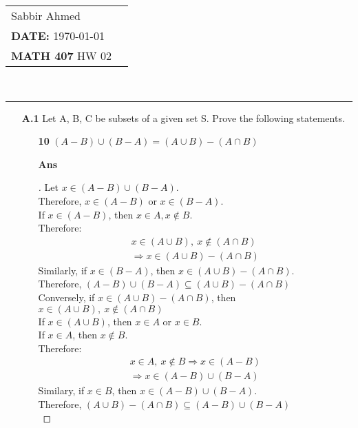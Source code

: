 \documentclass[paper=usletter, fontsize=12pt]{article}
\newcommand{\documentinfo}[5]{
    \begin{centering}
        \parbox{2in}{
        \begin{spacing}{1}
            \begin{flushleft}
                \begin{tabular}{l l}
                    #1 \\
                    #2 \\
                    #3 \\
                \end{tabular}\\
                \rule{\textwidth}{1pt}
            \end{flushleft}
        \end{spacing}
        }
    \end{centering}
}
\begin{document}
    \documentinfo{Sabbir Ahmed}{\textbf{DATE:} \today}{\textbf{MATH 407} HW 02}
    \vspace{-0.2in}

    \begin{itemize}

        \item[\textbf{A.1}] Let A, B, C be subsets of a given set S. Prove the
        following statements.

            \begin{itemize}

                \item[\textbf{10}] $(A - B) \cup (B - A) = (A \cup B) - (A \cap
                B)$
                \item[\textbf{Ans}]
                \begin{proof}[\unskip\nopunct]
                    Let $x \in (A - B) \cup (B - A)$. \\
                    Therefore, $x \in (A - B)$ or $x \in (B - A)$.\\

                    If $x \in (A - B)$, then $x \in A, x \not\in B$.\\
                    Therefore:
                    \begin{align*}
                        x \in (A \cup B), \ x \not\in (A \cap B) \\
                        \Rightarrow x \in (A \cup B) - (A \cap B)
                    \end{align*}
                    Similarly, if $x \in (B - A)$, then $x \in (A \cup B) - (A
                    \cap B)$. \\ Therefore, $(A - B) \cup (B - A) \subseteq (A
                    \cup B) - (A \cap B)$ \\

                    Conversely, if $x \in (A \cup B) - (A \cap B)$, then $x \in
                    (A \cup B), \ x \not\in (A \cap B)$ \\ If $x \in (A \cup
                    B)$, then $x \in A$ or $x \in B$. \\ If $x \in A$, then $x
                    \not\in B$. \\ Therefore:
                    \begin{align*}
                        x \in A, \ x \not\in B
                        \Rightarrow x \in (A - B) \\
                        \Rightarrow x \in (A - B) \cup (B - A)
                    \end{align*}
                    Similary, if $x \in B$, then $x \in (A - B) \cup (B - A)$.
                    \\ Therefore, $(A \cup B) - (A \cap B) \subseteq (A - B)
                    \cup (B - A)$ \\


\end{proof}
\end{itemize}
\end{itemize}
\end{document}
